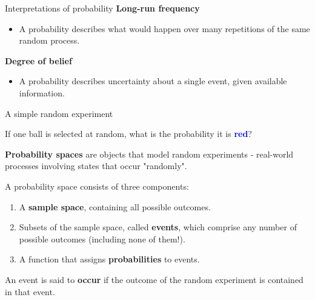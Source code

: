 \documentclass[12pt]{beamer}
\newcommand{\vocab}[1]{\textcolor{AggieMaroon}{\textbf{#1}}}
\begin{document}
\begin{frame}{}
\begin{block}{Interpretations of probability}
\vocab{Long-run frequency}
\begin{itemize}
\item A probability describes what would happen over many repetitions of the same random process.
\end{itemize}
\vocab{Degree of belief}
\begin{itemize}
\item A probability describes uncertainty about a single event, given available information.
\end{itemize}
\end{block}
\end{frame}

\begin{frame}{}
\begin{block}{A simple random experiment}
\vspace{0.2cm}
\centering
{}

If one ball is selected at random, what is the probability it is \textcolor{blue}{\textbf{red}}?
\end{block}
\end{frame}

\begin{frame}{}
\begin{block}{}
\vocab{Probability spaces} are objects that model random experiments - real-world processes involving states that occur "randomly".

\vspace{0.2cm}
A probability space consists of three components:
\begin{enumerate}
  \item A \vocab{sample space}, containing all possible outcomes.
  \item Subsets of the sample space, called \vocab{events}, which comprise any number of possible outcomes (including none of them!).
  \item A function that assigns \vocab{probabilities} to events.
\end{enumerate}

\vspace{0.2cm}
An event is said to \vocab{occur} if the outcome of the random experiment is contained in that event.
\end{block}
\end{frame}
\end{document}
